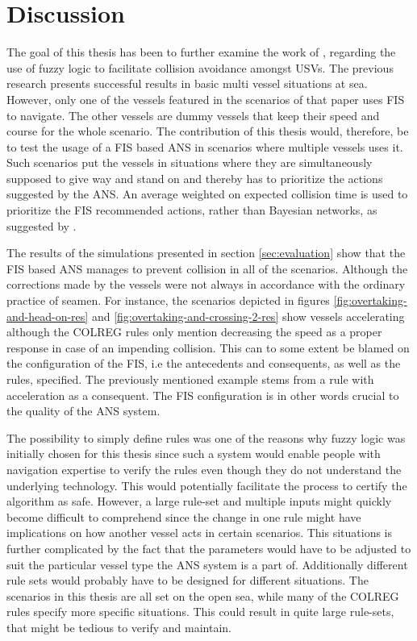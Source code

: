 \chapter{Discussion}%
\label{chap:disc}
The goal of this thesis has been to further examine the work of \textcite{perera2012intelligent}, regarding the use of fuzzy logic to facilitate collision avoidance amongst USVs. The previous research presents successful results in
basic multi vessel situations at sea. However, only one of the vessels featured in the scenarios of that paper uses FIS to navigate. The other vessels
are dummy vessels that keep their speed and course for the whole scenario.
The contribution of this thesis would, therefore, be to test the usage of a FIS
based ANS in scenarios where multiple vessels uses it. Such scenarios put the vessels in situations where they are simultaneously supposed to give way and stand on and thereby has to prioritize the actions suggested by the ANS. An average weighted on expected collision time is used to prioritize the FIS recommended actions, rather
than Bayesian networks, as suggested by \textcite{perera2012intelligent}.

The results of the simulations presented in section \ref{sec:evaluation} show that the FIS based ANS manages to prevent collision in all of the scenarios. Although the corrections made by the vessels were not always in accordance with the ordinary practice of seamen. For instance, the scenarios depicted in figures \ref{fig:overtaking-and-head-on-res} and \ref{fig:overtaking-and-crossing-2-res} show vessels accelerating although the COLREG rules only mention decreasing the speed as a proper response in case of an impending collision. This can to some extent be blamed on the configuration of the FIS, i.e the  antecedents and consequents, as well as the rules, specified. The previously mentioned example stems from a rule with acceleration as a consequent.  The FIS configuration is in other words crucial to the quality of the ANS system. 

The possibility to simply define rules was one of the reasons why fuzzy logic was initially chosen for this thesis since such a system would enable people with navigation expertise to verify the rules even though they do not understand the underlying technology. This would potentially facilitate the process to certify the algorithm as safe. However, a large rule-set  and multiple inputs might quickly become difficult to comprehend since the change in one rule might have implications on how another vessel acts in  certain scenarios. This situations is further complicated by the fact that the parameters would have to be adjusted to suit the particular vessel type the ANS system is a part of. Additionally different rule sets would probably have to be designed for different situations. The scenarios in this thesis are all set on the open sea, while many of the COLREG rules specify more specific situations. This could result in quite large rule-sets, that might be tedious to verify and maintain.

